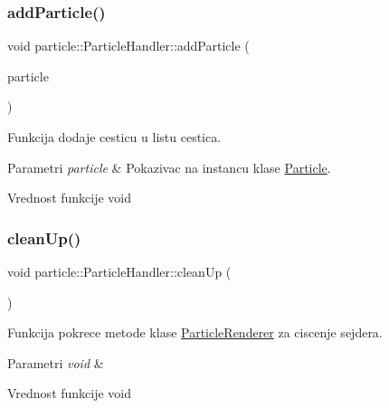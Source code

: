 \subsubsection{\texorpdfstring{add\+Particle()}{addParticle()}}
{\footnotesize\ttfamily void particle\+::\+Particle\+Handler\+::add\+Particle (\begin{DoxyParamCaption}\item[{\hyperlink{classparticle_1_1Particle}{Particle} $\ast$}]{particle }\end{DoxyParamCaption})}



Funkcija dodaje cesticu u listu cestica. 


\begin{DoxyParams}{Parametri}
{\em particle} & Pokazivac na instancu klase \hyperlink{classparticle_1_1Particle}{Particle}. \\
\hline
\end{DoxyParams}
\begin{DoxyReturn}{Vrednost funkcije}
void 
\end{DoxyReturn}
\mbox{\label{classparticle_1_1ParticleHandler_a098ece1e3f68c2d3bdaef95a0781e6eb}} 
\subsubsection{\texorpdfstring{clean\+Up()}{cleanUp()}}
{\footnotesize\ttfamily void particle\+::\+Particle\+Handler\+::clean\+Up (\begin{DoxyParamCaption}\item[{void}]{ }\end{DoxyParamCaption})}



Funkcija pokrece metode klase \hyperlink{classparticle_1_1ParticleRenderer}{Particle\+Renderer} za ciscenje sejdera. 


\begin{DoxyParams}{Parametri}
{\em void} & \\
\hline
\end{DoxyParams}
\begin{DoxyReturn}{Vrednost funkcije}
void 
\end{DoxyReturn}
\mbox{\label{classparticle_1_1ParticleHandler_a171b2f5a6865b688563eb7394bf8371b}} 
